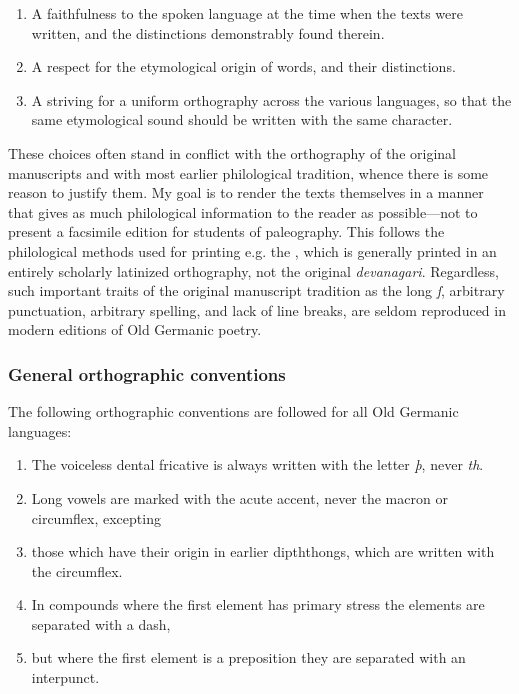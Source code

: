     \begin{enumerate}
      \item A faithfulness to the spoken language at the time when the texts were written, and the distinctions demonstrably found therein.
      \item A respect for the etymological origin of words, and their distinctions.
      \item A striving for a uniform orthography across the various languages, so that the same etymological sound should be written with the same character.
    \end{enumerate}

    These choices often stand in conflict with the orthography of the original manuscripts and with most earlier philological tradition, whence there is some reason to justify them.  My goal is to render the texts themselves in a manner that gives as much philological information to the reader as possible—not to present a facsimile edition for students of paleography.  This follows the philological methods used for printing e.g. the \Rigveda, which is generally printed in an entirely scholarly latinized orthography, not the original \emph{devanagari}.  Regardless, such important traits of the original manuscript tradition as the long \emph{ſ}, arbitrary punctuation, arbitrary spelling, and lack of line breaks, are seldom reproduced in modern editions of Old Germanic poetry.

    \subsubsection{General orthographic conventions}

    The following orthographic conventions are followed for all Old Germanic languages:

    \begin{enumerate}
    \item The voiceless dental fricative is always written with the letter \emph{þ}, never \emph{th}.
    \item Long vowels are marked with the acute accent, never the macron or circumflex, excepting
    \item those which have their origin in earlier dipththongs, which are written with the circumflex.
    \item In compounds where the first element has primary stress the elements are separated with a dash,
    \item but where the first element is a preposition they are separated with an interpunct.
    \end{enumerate}

